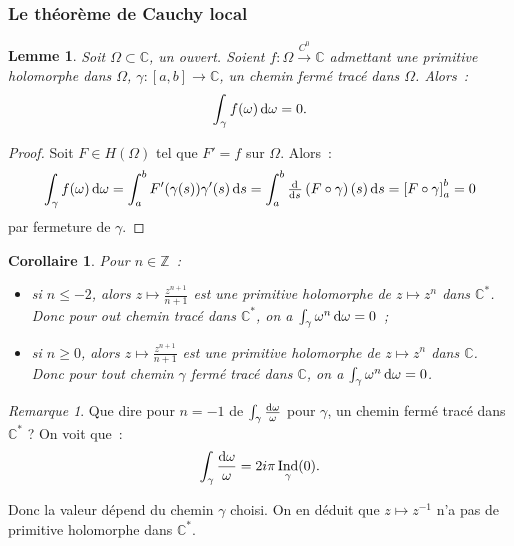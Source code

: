 \documentclass{report}
\newtheorem{cor}[thm]{Corollaire}
\newtheorem{lem}[thm]{Lemme}
\theoremstyle{definition}
\theoremstyle{remark}
\newtheorem*{rmq}{Remarque}
\numberwithin{equation}{section}
\newcommand{\C}{\mathbb C}
\newcommand{\Z}{\mathbb Z}
\DeclareMathOperator{\Ind}{Ind}
\newcommand{\toC}[1]{\xrightarrow{C^{#1}}}
\newcommand{\tocont}{\toC 0}
\begin{document}
		\subsubsection{Le théorème de Cauchy local}
			\begin{lem} Soit $\Omega \subset \C$, un ouvert. Soient $f : \Omega \tocont \C$ admettant une primitive holomorphe dans $\Omega$, $\gamma : [a, b] \to \C$,
			un chemin fermé tracé dans $\Omega$. Alors~:
			\begin{equation}
				\int_\gamma f(\omega)\dif \omega = 0.
			\end{equation}
			\end{lem}

			\begin{proof} Soit $F \in H(\Omega)$ tel que $F' = f$ sur $\Omega$. Alors~:
			\begin{equation}
				\int_\gamma f(\omega)\dif \omega = \int_a^b F'(\gamma(s))\gamma'(s)\dif s = \int_a^b \od {}s\left(F \circ \gamma\right)(s)\dif s = \left[F \circ \gamma\right]_a^b = 0
			\end{equation}
			par fermeture de $\gamma$.
			\end{proof}

			\begin{cor} Pour $n \in \Z$~:
			\begin{itemize}
				\item si $n \leq -2$, alors $z \mapsto \frac {z^{n+1}}{n+1}$ est une primitive holomorphe de $z \mapsto z^n$ dans $\C^*$. Donc pour out chemin tracé dans
				$\C^*$, on a $\int_\gamma \omega^n\dif \omega = 0$~;
				\item si $n \geq 0$, alors $z \mapsto \frac {z^{n+1}}{n+1}$ est une primitive holomorphe de $z \mapsto z^n$ dans $\C$. Donc pour tout chemin $\gamma$
				fermé tracé dans $\C$, on a $\int_\gamma \omega^n\dif \omega = 0$.
			\end{itemize}
			\end{cor}

			\begin{rmq} Que dire pour $n=-1$ de $\int_\gamma \frac {\dif \omega}{\omega}$ pour $\gamma$, un chemin fermé tracé dans $\C^*$ ? On voit que~:
			\begin{equation}
				\int_\gamma\frac {\dif \omega}\omega = 2i\pi \Ind_\gamma(0).
			\end{equation}

			Donc la valeur dépend du chemin $\gamma$ choisi. On en déduit que $z \mapsto z^{-1}$ n'a pas de primitive holomorphe dans $\C^*$.
			\end{rmq}
\end{document}
